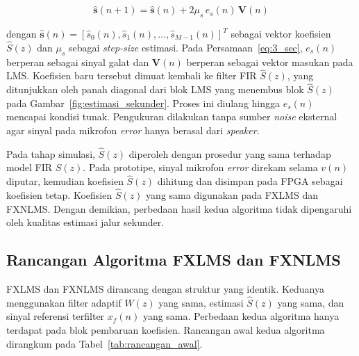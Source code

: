\begin{equation}
  \label{eq:3_sec}
  \hat{\mathbf{s}}(n+1) = \hat{\mathbf{s}}(n) + 2\mu_s\,e_s(n)\,\mathbf{V}(n)
\end{equation}

dengan $\hat{\mathbf{s}}(n) = [\hat{s}_0(n), \hat{s}_1(n), \ldots, \hat{s}_{M-1}(n)]^T$ sebagai vektor koefisien $\hat{S}(z)$ dan $\mu_s$ sebagai \emph{step-size} estimasi. Pada Persamaan~\eqref{eq:3_sec}, $e_s(n)$ berperan sebagai sinyal galat dan $\mathbf{V}(n)$ berperan sebagai vektor masukan pada LMS. Koefisien baru tersebut dimuat kembali ke filter FIR $\hat{S}(z)$, yang ditunjukkan oleh panah diagonal dari blok LMS yang menembus blok $\hat{S}(z)$ pada Gambar~\ref{fig:estimasi_sekunder}. Proses ini diulang hingga $e_s(n)$ mencapai kondisi tunak. Pengukuran dilakukan tanpa sumber \emph{noise} eksternal agar sinyal pada mikrofon \emph{error} hanya berasal dari \emph{speaker}.

Pada tahap simulasi, $\hat{S}(z)$ diperoleh dengan prosedur yang sama terhadap model FIR $S(z)$. Pada prototipe, sinyal mikrofon \emph{error} direkam selama $v(n)$ diputar, kemudian koefisien $\hat{S}(z)$ dihitung dan disimpan pada FPGA sebagai koefisien tetap. Koefisien $\hat{S}(z)$ yang sama digunakan pada FXLMS dan FXNLMS. Dengan demikian, perbedaan hasil kedua algoritma tidak dipengaruhi oleh kualitas estimasi jalur sekunder.

\subsection{Rancangan Algoritma FXLMS dan FXNLMS}
\label{sec:rancangan_algoritma}

FXLMS dan FXNLMS dirancang dengan struktur yang identik. Keduanya menggunakan filter adaptif $W(z)$ yang sama, estimasi $\hat{S}(z)$ yang sama, dan sinyal referensi terfilter $x_f(n)$ yang sama. Perbedaan kedua algoritma hanya terdapat pada blok pembaruan koefisien. Rancangan awal kedua algoritma dirangkum pada Tabel~\ref{tab:rancangan_awal}.

